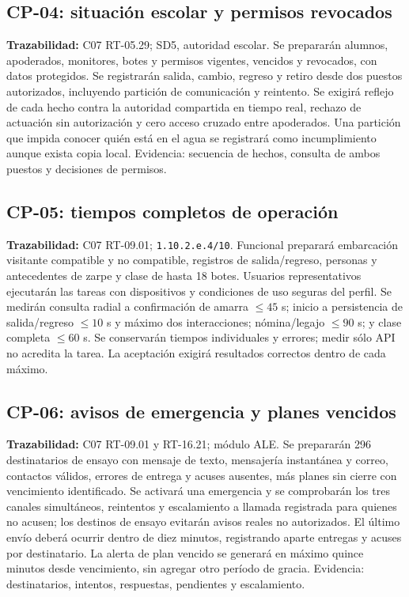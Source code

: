 \subsection{CP-04: situación escolar y permisos revocados}
\label{caso:cp-04}
\textbf{Trazabilidad:} C07 RT-05.29; SD5, autoridad escolar. Se prepararán alumnos, apoderados, monitores, botes y permisos vigentes, vencidos y revocados, con datos protegidos. Se registrarán salida, cambio, regreso y retiro desde dos puestos autorizados, incluyendo partición de comunicación y reintento. Se exigirá reflejo de cada hecho contra la autoridad compartida en tiempo real, rechazo de actuación sin autorización y cero acceso cruzado entre apoderados. Una partición que impida conocer quién está en el agua se registrará como incumplimiento aunque exista copia local. Evidencia: secuencia de hechos, consulta de ambos puestos y decisiones de permisos.

\subsection{CP-05: tiempos completos de operación}
\label{caso:cp-05}
\textbf{Trazabilidad:} C07 RT-09.01; \texttt{1.10.2.e.4/10}. Funcional preparará embarcación visitante compatible y no compatible, registros de salida/regreso, personas y antecedentes de zarpe y clase de hasta 18 botes. Usuarios representativos ejecutarán las tareas con dispositivos y condiciones de uso seguras del perfil. Se medirán consulta radial a confirmación de amarra $\leq45$ s; inicio a persistencia de salida/regreso $\leq10$ s y máximo dos interacciones; nómina/legajo $\leq90$ s; y clase completa $\leq60$ s. Se conservarán tiempos individuales y errores; medir sólo API no acredita la tarea. La aceptación exigirá resultados correctos dentro de cada máximo.

\subsection{CP-06: avisos de emergencia y planes vencidos}
\label{caso:cp-06}
\textbf{Trazabilidad:} C07 RT-09.01 y RT-16.21; módulo ALE. Se prepararán 296 destinatarios de ensayo con mensaje de texto, mensajería instantánea y correo, contactos válidos, errores de entrega y acuses ausentes, más planes sin cierre con vencimiento identificado. Se activará una emergencia y se comprobarán los tres canales simultáneos, reintentos y escalamiento a llamada registrada para quienes no acusen; los destinos de ensayo evitarán avisos reales no autorizados. El último envío deberá ocurrir dentro de diez minutos, registrando aparte entregas y acuses por destinatario. La alerta de plan vencido se generará en máximo quince minutos desde vencimiento, sin agregar otro período de gracia. Evidencia: destinatarios, intentos, respuestas, pendientes y escalamiento.

